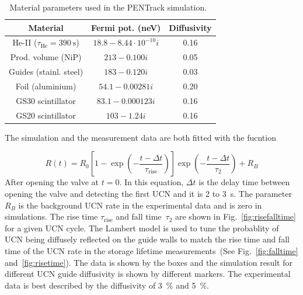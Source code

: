 \begin{table}
  \centering
\begin{tabular}{|c|c|c|}
  \hline
Material & Fermi pot. (neV) & Diffusivity \\
\hline
He-II ($\tau_\mathrm{He} = \SI{390}{\second}$) & $18.8 - 8.44\cdot10^{-10} i$ & 0.16 \\
Prod. volume (NiP) & $213 - 0.100 i$ & 0.05 \\
Guides (stainl. steel) & $183 - 0.120 i$ & 0.03 \\
Foil (aluminium) & $54.1 - 0.00281 i$ & 0.20 \\
GS30 scintillator & $83.1 - 0.000123 i$ & 0.16 \\
  GS20 scintillator & $103 - 1.24 i$ & 0.16 \\
  \hline
\end{tabular}
\caption{Material parameters used in the PENTrack simulation.~\cite{atchison2009transmission,Ban2016,sears1992neutron}}
\label{tab:materials}
\end{table}

The simulation and the measurement data are both fitted with the fucntion

\begin{equation}
R(t) = R_0 \left[ 1 - \exp \left( -\frac{t - \Delta t}{\tau_\mathrm{rise}} \right) \right] \exp \left( -\frac{t - \Delta t}{\tau_2} \right) + R_B
\end{equation}
After opening the valve at $t=0$. In this equation, $\Delta t$ is the
delay time between opening the valve and detecting the first UCN and
it is 2 to 3~s. The parameter $ R_B$ is the background UCN rate in the
experimental data and is zero in simulations.  The rise time
$\tau_{\mathrm{rise}}$ and fall time~$\tau_2$ are shown in
Fig.~\ref{fig:risefalltime} for a given UCN cycle.  The Lambert model
is used to tune the probablity of UCN being diffusely reflected on the
guide walls to match the rise time and fall
time of the UCN rate in the storage lifetime
measurements~(See Fig.~\ref{fig:falltime} and~\ref{fig:risetime}). The
data is shown by the boxes and the simulation result for different UCN
guide diffusivity is shown by different markers. The experimental data
is best described by the diffusivity of 3~\% and 5~\%.


